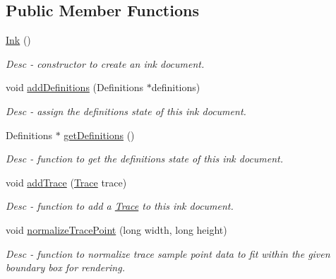 \subsection*{Public Member Functions}
\begin{DoxyCompactItemize}
\item 
\hyperlink{classbr_1_1ufscar_1_1lince_1_1mmi_1_1ink_1_1Ink_ada758b5f8c862e96b3bc0ab8ab5c305e}{Ink} ()
\begin{DoxyCompactList}\small\item\em Desc -\/ constructor to create an ink document. \item\end{DoxyCompactList}\item 
void \hyperlink{classbr_1_1ufscar_1_1lince_1_1mmi_1_1ink_1_1Ink_a020076b1bfae4c76a9fa42f87aa618a7}{addDefinitions} (Definitions $\ast$definitions)
\begin{DoxyCompactList}\small\item\em Desc -\/ assign the definitions state of this ink document. \item\end{DoxyCompactList}\item 
Definitions $\ast$ \hyperlink{classbr_1_1ufscar_1_1lince_1_1mmi_1_1ink_1_1Ink_a1a6e44946dd40a11af964dabc129d11c}{getDefinitions} ()
\begin{DoxyCompactList}\small\item\em Desc -\/ function to get the definitions state of this ink document. \item\end{DoxyCompactList}\item 
void \hyperlink{classbr_1_1ufscar_1_1lince_1_1mmi_1_1ink_1_1Ink_a9fdefbe3184e360412b74675b853ad16}{addTrace} (\hyperlink{classbr_1_1ufscar_1_1lince_1_1mmi_1_1ink_1_1Trace}{Trace} trace)
\begin{DoxyCompactList}\small\item\em Desc -\/ function to add a \hyperlink{classbr_1_1ufscar_1_1lince_1_1mmi_1_1ink_1_1Trace}{Trace} to this ink document. \item\end{DoxyCompactList}\item 
void \hyperlink{classbr_1_1ufscar_1_1lince_1_1mmi_1_1ink_1_1Ink_a6f102e2395f0ebac1d4044291389cbf2}{normalizeTracePoint} (long width, long height)
\begin{DoxyCompactList}\small\item\em Desc -\/ function to normalize trace sample point data to fit within the given boundary box for rendering. \item\end{DoxyCompactList}\end{DoxyCompactItemize}
